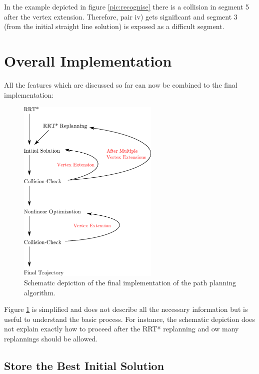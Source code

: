 In the example depicted in figure \ref{pic:recognise} there is a collision in segment 5 after the vertex extension. 
Therefore, pair iv) gets significant and segment 3 (from the initial straight line solution) is exposed as a difficult segment.\newpage

\section{Overall Implementation}

All the features which are discussed so far can now be combined to the final implementation: \newline

\begin{figure}[H]
   \centering
   \includegraphics[width=0.6\textwidth]{pics/overall.eps}
   \caption{Schematic depiction of the final implementation of the path planning algorithm.}
   \label{pic:overall}
\end{figure}

Figure \ref{pic:overall} is simplified and does not describe all the necessary information but is useful to understand the basic process. For instance, the schematic depiction does not explain exactly how to proceed after the RRT* replanning and ow many replannings should be allowed. 

\subsection{Store the Best Initial Solution}

